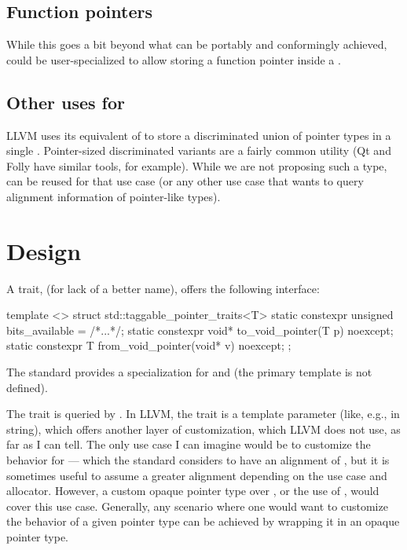 \documentclass{wg21}
\begin{document}
\subsection{Function pointers}

While this goes a bit beyond what can be portably and conformingly achieved,  could be user-specialized
to allow storing a function pointer inside a .

\subsection{Other uses for }

LLVM uses its equivalent of  to store a discriminated union of pointer types in a single .
Pointer-sized discriminated variants are a fairly common utility (Qt and Folly have similar tools, for example).
While we are not proposing such a type,  can be reused for that use case (or any other use case that wants to query
alignment information of pointer-like types).

\section{Design}

A trait,  (for lack of a better name), offers the following interface:

\begin{colorblock}

template <>
struct std::taggable_pointer_traits<T> {
    static constexpr unsigned bits_available = /*...*/;
    static constexpr void* to_void_pointer(T p) noexcept;
    static constexpr T from_void_pointer(void* v) noexcept;
};
\end{colorblock}

The standard provides a specialization for  and  (the primary template is not defined).

The trait is queried by . In LLVM, the trait is a template parameter (like, e.g.,  in string),
which offers another layer of customization, which LLVM does not use, as far as I can tell.
The only use case I can imagine would be to customize the behavior for  --- which the standard considers to have an alignment
of , but it is sometimes useful to assume a greater alignment depending on the use case and allocator.
However, a custom opaque pointer type over , or the use of , would cover this use case.
Generally, any scenario where one would want to customize the behavior of a given pointer type can be achieved by wrapping it in an opaque pointer type.
\end{document}

